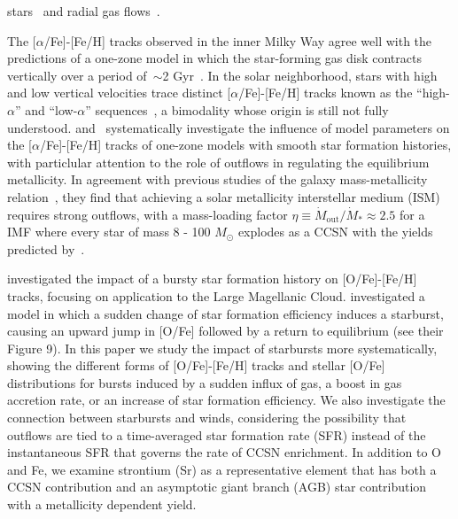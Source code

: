 stars~\citep{Schoenrich2009a, Minchev2017} and radial gas 
flows~\citep{Lacey1985, Bilitewski2012}. 
\par 
The [$\alpha$/Fe]-[Fe/H] tracks observed in the inner Milky Way agree well with 
the predictions of a one-zone model in which the star-forming gas disk 
contracts vertically over a period of~$\sim$2 Gyr~\citep{Hayden2015, 
Freudenburg2017}. In the solar neighborhood, stars with high and low vertical 
velocities trace distinct [$\alpha$/Fe]-[Fe/H] tracks known as the 
``high-$\alpha$'' and ``low-$\alpha$'' sequences~\citep{Bensby2003, 
Hayden2015}, a bimodality whose origin is still not fully understood. 
\citet{Andrews2017} and~\citet{Weinberg2017b} systematically 
investigate the influence of model parameters on the [$\alpha$/Fe]-[Fe/H] 
tracks of one-zone models with smooth star formation histories, with 
particlular attention to the role of outflows in regulating the equilibrium 
metallicity. In agreement with previous studies of the galaxy mass-metallicity 
relation~\citep[e.g. ][]{Dalcanton2007, Finlator2008, Peeples2011, Zahid2012}, 
they find that achieving a solar metallicity interstellar medium (ISM) requires 
strong outflows, with a mass-loading factor $\eta\equiv\dot{M}_\text{out}/
\dot{M}_*\approx2.5$ for a~\citet{Kroupa2001} IMF where every star of mass 
8 - 100 $M_\odot$ explodes as a CCSN with the yields predicted 
by~\citet{Chieffi2004,Chieffi2013}. 
\par 
\citet{Gilmore1991} investigated the impact of a bursty star formation history 
on [O/Fe]-[Fe/H] tracks, focusing on application to the Large Magellanic 
Cloud. \citet{Weinberg2017b} investigated a model in which a sudden change 
of star formation efficiency induces a starburst, causing an upward jump in 
[O/Fe] followed by a return to equilibrium (see their Figure 9). In this 
paper we study the impact of starbursts more systematically, showing the 
different forms of [O/Fe]-[Fe/H] tracks and stellar [O/Fe] distributions for 
bursts induced by a sudden influx of gas, a boost in gas accretion rate, or 
an increase of star formation efficiency. We also investigate the 
connection between starbursts and winds, considering the possibility that 
outflows are tied to a time-averaged star formation rate (SFR) instead of the 
instantaneous SFR that governs the rate of CCSN enrichment. In addition to 
O and Fe, we examine strontium (Sr) as a representative element that has both 
a CCSN contribution and an asymptotic giant branch (AGB) star contribution 
with a metallicity dependent yield. 
\par 
